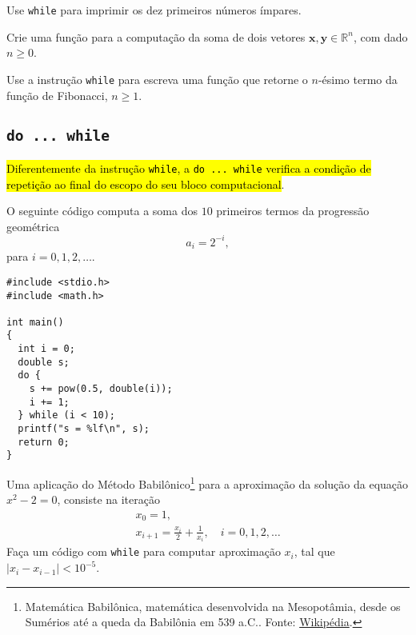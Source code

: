 \documentclass[12pt]{article}
\begin{document}
\begin{exr}
  Use \lstinline!while! para imprimir os dez primeiros números ímpares.
\end{exr}

\begin{exr}
  Crie uma função para a computação da soma de dois vetores $\pmb{x}, \pmb{y}\in\mathbb{R}^n$, com dado $n\geq 0$.
\end{exr}

\begin{exr}
  Use a instrução \lstinline!while! para escreva uma função que retorne o $n$-ésimo termo da função de Fibonacci{\fibonacci}, $n\geq 1$.
\end{exr}

\subsection{\texttt{do ... while}}

\hl{Diferentemente da instrução \texttt{while}, a \texttt{do ... while} verifica a condição de repetição ao final do escopo do seu bloco computacional}.

\begin{ex}
  O seguinte código computa a soma dos $10$ primeiros termos da progressão geométrica
  \begin{equation}
    a_i = 2^{-i},
  \end{equation}
  para $i = 0, 1, 2, \ldots$.

\begin{lstlisting}[caption=doWhile.cc]
#include <stdio.h>
#include <math.h>

int main()
{
  int i = 0;
  double s;
  do {
    s += pow(0.5, double(i));
    i += 1;
  } while (i < 10);
  printf("s = %lf\n", s);
  return 0;
}
\end{lstlisting}  
\end{ex}

\begin{exr}
  Uma aplicação do Método Babilônico\footnote{Matemática Babilônica, matemática desenvolvida na Mesopotâmia, desde os Sumérios até a queda da Babilônia em 539 a.C.. Fonte: \href{https://pt.wikipedia.org/wiki/Matem\%C3\%A1tica\_babil\%C3\%B4nica}{Wikipédia}.} para a aproximação da solução da equação $x^2-2 = 0$, consiste na iteração
  \begin{gather}
    x_0 = 1,\\
    x_{i+1} = \frac{x_i}{2} + \frac{1}{x_i},\quad i=0,1,2,\ldots
  \end{gather}
  Faça um código com \lstinline+while+ para computar aproximação $x_{i}$, tal que $|x_{i}-x_{i-1}|<10^{-5}$.
\end{exr}
\end{document}
